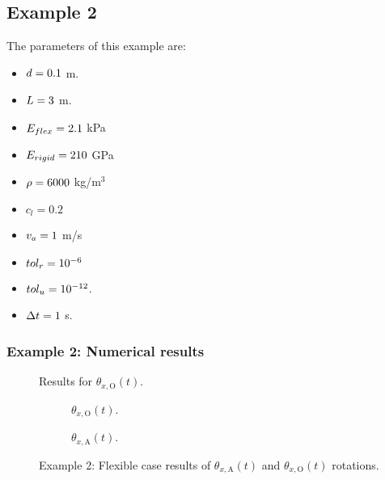 \documentclass[3p,a4paper,11pt,review]{elsarticle}
\begin{document}
\clearpage

\subsection{Example 2}



The parameters of this example are:

\begin{itemize}
	\item $d= 0.1$ m.
	\item $L = 3 $ m.
	\item $E_{flex} = 2.1$ kPa
	\item $E_{rigid} = 210$ GPa
	\item $\rho = 6000$ kg/m$^3$
	\item $c_l = 0.2$
	\item $v_{a} = 1$ m/s
	\item $tol_r = 10^{-6}$
	\item $tol_u = 10^{-12}$.
	\item $\Delta t = 1$ s. 

\end{itemize}

\subsubsection{Example 2: Numerical results}

\begin{figure}[htb]
	\centering
	\resizebox{.5\textwidth}{!}{}
	\caption{Results for $\theta_{x,\text{O}}(t)$.}
	\label{fig:simplePropellerRigidThetaX}
\end{figure}


\begin{figure}[htb]
	\begin{subfigure}{0.49\textwidth}
		\centering
		\resizebox{\textwidth}{!}{}
		\caption{$\theta_{x,\text{O}}(t)$.}
		\label{fig:simplePropellerFlexThetaXO}
	\end{subfigure}
	\begin{subfigure}{.45\textwidth}
		\centering
		\resizebox{\textwidth}{!}{}
		\caption{$\theta_{x,\text{A}}(t)$.}
		\label{fig:simplePropellerFlexThetaXA}
	\end{subfigure}
	\caption{Example 2: Flexible case results of $\theta_{x,\text{A}}(t)$ and $\theta_{x,\text{O}}(t)$ rotations.}
	\label{fig:simplePropellerFlexThetas}
\end{figure}
\end{document}
